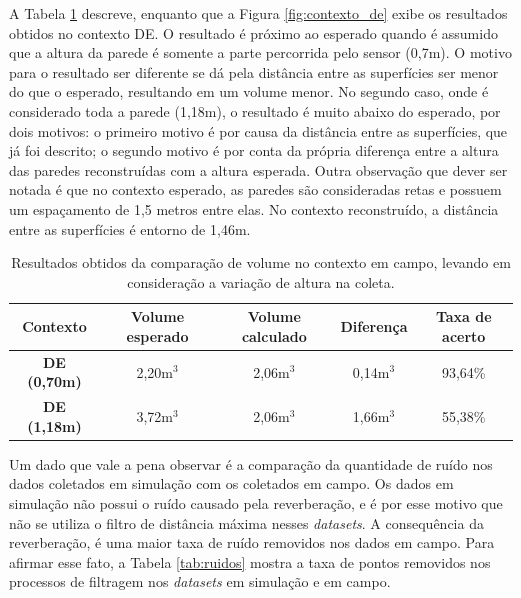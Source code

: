 A Tabela \ref{tab:result_inloco_vol} descreve,  enquanto que a Figura \ref{fig:contexto_de} exibe os resultados obtidos no contexto DE.
O resultado é próximo ao esperado quando é assumido que a altura da parede é somente a parte percorrida pelo sensor (0,7m).
O motivo para o resultado ser diferente se dá pela distância entre as superfícies ser menor do que o esperado, resultando em um volume menor.
No segundo caso, onde é considerado toda a parede (1,18m), o resultado é muito abaixo do esperado, por dois motivos: o primeiro motivo é por causa da distância entre as superfícies, que já foi descrito; o segundo motivo é por conta da própria diferença entre a altura das paredes reconstruídas com a altura esperada.
Outra observação que dever ser notada é que no contexto esperado, as paredes são consideradas retas e possuem um espaçamento de 1,5 metros entre elas. 
No contexto reconstruído, a distância entre as superfícies é entorno de 1,46m.

\begin{table}[H]
    \centering
    \caption{Resultados obtidos da comparação de volume no contexto em campo, levando em consideração a variação de altura na coleta.}
    \begin{tabular}{@{}ccccc@{}}
        \toprule
        \textbf{Contexto} & \textbf{Volume esperado} & \textbf{Volume calculado} & \textbf{Diferença} & \textbf{Taxa de acerto} \\ \midrule
        \textbf{DE (0,70m)} & 2,20m$^3$ & 2,06m$^3$ & 0,14m$^3$ & 93,64\% \\
        \textbf{DE (1,18m)} & 3,72m$^3$ & 2,06m$^3$ & 1,66m$^3$ & 55,38\% \\ \bottomrule
    \end{tabular}
    \label{tab:result_inloco_vol}
\end{table}

Um dado que vale a pena observar é a comparação da quantidade de ruído nos dados coletados em simulação com os coletados em campo.
Os dados em simulação não possui o ruído causado pela reverberação, e é por esse motivo que não se utiliza o filtro de distância máxima nesses \textit{datasets}.
A consequência da reverberação, é uma maior taxa de ruído removidos nos dados em campo.
Para afirmar esse fato, a Tabela \ref{tab:ruidos} mostra a taxa de pontos removidos nos processos de filtragem nos \textit{datasets} em simulação e em campo.

